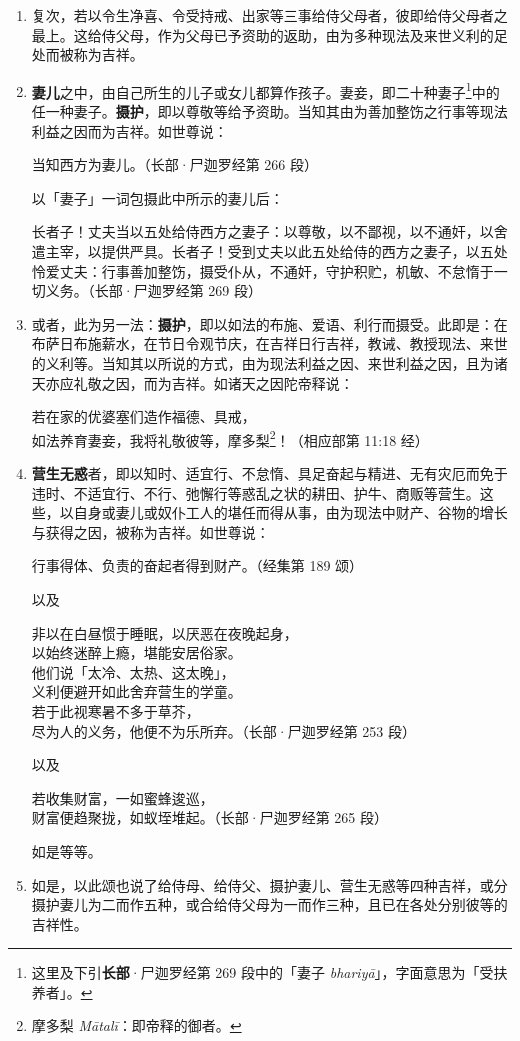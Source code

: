 \begin{enumerate}
\item 复次，若以令生净喜、令受持戒、出家等三事给侍父母者，彼即给侍父母者之最上。这给侍父母，作为父母已予资助的返助，由为多种现法及来世义利的足处而被称为吉祥。
\item \textbf{妻儿}之中，由自己所生的儿子或女儿都算作孩子。妻妾，即二十种妻子\footnote{这里及下引\textbf{长部}·尸迦罗经第 269 段中的「妻子 \textit{bhariyā}」，字面意思为「受扶养者」。}中的任一种妻子。\textbf{摄护}，即以尊敬等给予资助。当知其由为善加整饬之行事等现法利益之因而为吉祥。如世尊说：\begin{quoting}当知西方为妻儿。（长部·尸迦罗经第 266 段）\end{quoting}以「妻子」一词包摄此中所示的妻儿后：\begin{quoting}长者子！丈夫当以五处给侍西方之妻子：以尊敬，以不鄙视，以不通奸，以舍遣主宰，以提供严具。长者子！受到丈夫以此五处给侍的西方之妻子，以五处怜爱丈夫：行事善加整饬，摄受仆从，不通奸，守护积贮，机敏、不怠惰于一切义务。（长部·尸迦罗经第 269 段）\end{quoting}
\item 或者，此为另一法：\textbf{摄护}，即以如法的布施、爱语、利行而摄受。此即是：在布萨日布施薪水，在节日令观节庆，在吉祥日行吉祥，教诫、教授现法、来世的义利等。当知其以所说的方式，由为现法利益之因、来世利益之因，且为诸天亦应礼敬之因，而为吉祥。如诸天之因陀帝释说：\begin{quoting}若在家的优婆塞们造作福德、具戒，\\如法养育妻妾，我将礼敬彼等，摩多梨\footnote{摩多梨 \textit{Mātalī}：即帝释的御者。}！（相应部第 11:18 经）\end{quoting}
\item \textbf{营生无惑}者，即以知时、适宜行、不怠惰、具足奋起与精进、无有灾厄而免于违时、不适宜行、不行、弛懈行等惑乱之状的耕田、护牛、商贩等营生。这些，以自身或妻儿或奴仆工人的堪任而得从事，由为现法中财产、谷物的增长与获得之因，被称为吉祥。如世尊说：\begin{quoting}行事得体、负责的奋起者得到财产。（经集第 189 颂）\end{quoting}以及\begin{quoting}非以在白昼惯于睡眠，以厌恶在夜晚起身，\\以始终迷醉上瘾，堪能安居俗家。\\他们说「太冷、太热、这太晚」，\\义利便避开如此舍弃营生的学童。\\若于此视寒暑不多于草芥，\\尽为人的义务，他便不为乐所弃。（长部·尸迦罗经第 253 段）\end{quoting}以及\begin{quoting}若收集财富，一如蜜蜂逡巡，\\财富便趋聚拢，如蚁垤堆起。（长部·尸迦罗经第 265 段）\end{quoting}如是等等。
\item 如是，以此颂也说了给侍母、给侍父、摄护妻儿、营生无惑等四种吉祥，或分摄护妻儿为二而作五种，或合给侍父母为一而作三种，且已在各处分别彼等的吉祥性。\end{enumerate}

